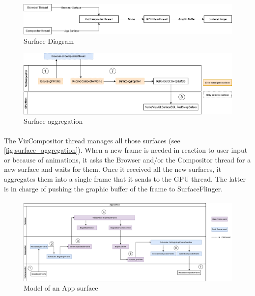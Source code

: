 \documentclass{kththesis}
\begin{document}
\begin{figure}[h]
    \centering
    \includegraphics[width=13cm]{kththesis/Figures/surface_diagram.png}
    \caption{Surface Diagram}
    \label{fig:surface_diagram}
\end{figure}

\begin{figure}[h]
    \centering
    \includegraphics[width=\linewidth]{kththesis/Figures/Surface_aggregation.png}
    \caption{Surface aggregation}
    \label{fig:surface_aggregation}
\end{figure}

\paragraph{}
The VizCompositor thread manages all those surfaces (see \autoref{fig:surface_aggregation}). When a new frame is needed in reaction to user input or because of animations, it asks the Browser and/or the Compositor thread for a new surface and waits for them. Once it received all the new surfaces, it aggregates them into a single frame that it sends to the GPU thread. The latter is in charge of pushing the graphic buffer of the frame to SurfaceFlinger. 

\paragraph{}

\begin{figure}
    \centering
    \includegraphics[width=\linewidth]{kththesis/Figures/App_surface.png}
    \caption{Model of an App surface}
    \label{fig:app_surface}
\end{figure}
\end{document}
